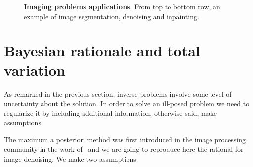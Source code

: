 \begin{figure}
{}\hspace{2em}%
%
\caption{\textbf{Imaging problems applications}. From top to bottom row, an example of image segmentation, denoising and inpainting.}
\label{ch1:fig:imaging-problems-example}
\end{figure}


\section{Bayesian rationale and total variation}
\label{ch1:sec:bayesian-rationale}
As remarked in the previous section, inverse problems involve some level of uncertainty about the solution. In order to solve an ill-posed problem we need to regularize it by including additional information, otherwise said, make assumptions.

The maximum a posteriori method was first introduced in the image processing community in the work of~\cite{geman84} and we are going to reproduce here the rational for image denoising. We make two assumptions

